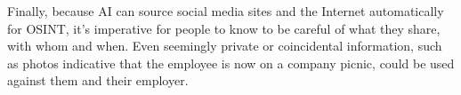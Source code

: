 
Finally, because AI can source social media sites and the Internet automatically for OSINT, it's imperative for people to know to be careful of what they share, with whom and when. Even seemingly private or coincidental information, such as photos indicative that the employee is now on a company picnic, could be used against them and their employer.




